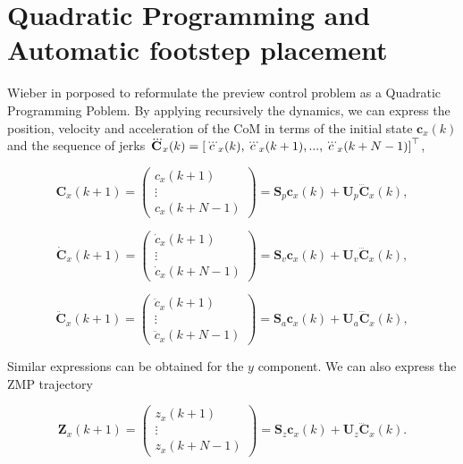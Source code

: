 \section{Quadratic Programming and Automatic footstep placement}

Wieber in \citep{WieberHumanoids2006} porposed to reformulate the preview control problem as a Quadratic Programming Poblem. By applying recursively the dynamics, we can express the position, velocity and acceleration  of the CoM in terms of the initial state ${\mathbf c}_x(k)$ and the sequence of jerks $\dddot{\mathbf C}_x(k) = \left[ \dddot{c}_x(k), \dddot{c}_x(k+1),...,\dddot{c}_x(k+N-1) \right]^{\top}$,

\begin{equation}
 \label{Eq:PosCMHorizon}
 {\mathbf C}_x(k+1) = \left(
 \begin{matrix}
  c_x(k+1) \\
  \vdots \\
  c_x(k+N-1)
 \end{matrix}
 \right) = {\mathbf S}_p {\mathbf c}_x(k) + {\mathbf U}_p \dddot{\mathbf C}_x(k),
\end{equation}

\begin{equation}
 \label{Eq:PosCMHorizon}
 \dot{\mathbf C}_x(k+1) = \left(
 \begin{matrix}
  \dot{c}_x(k+1) \\
  \vdots \\
  \dot{c}_x(k+N-1)
 \end{matrix}
 \right) = {\mathbf S}_v {\mathbf c}_x(k) + {\mathbf U}_v \dddot{\mathbf C}_x(k),
\end{equation}

\begin{equation}
 \label{Eq:PosCMHorizon}
 \ddot{\mathbf C}_x(k+1) = \left(
 \begin{matrix}
  \ddot{c}_x(k+1) \\
  \vdots \\
  \ddot{c}_x(k+N-1)
 \end{matrix}
 \right) = {\mathbf S}_a {\mathbf c}_x(k) + {\mathbf U}_a \dddot{\mathbf C}_x(k),
\end{equation}

Similar expressions can be obtained for the $y$ component. We can also express the ZMP trajectory

\begin{equation}
 \label{Eq:PosZMPHorizon}
 {\mathbf Z}_x(k+1) = \left(
 \begin{matrix}
  {z}_x(k+1) \\
  \vdots \\
  {z}_x(k+N-1)
 \end{matrix}
 \right) = {\mathbf S}_z {\mathbf c}_x(k) + {\mathbf U}_z \dddot{\mathbf C}_x(k).
\end{equation} 


